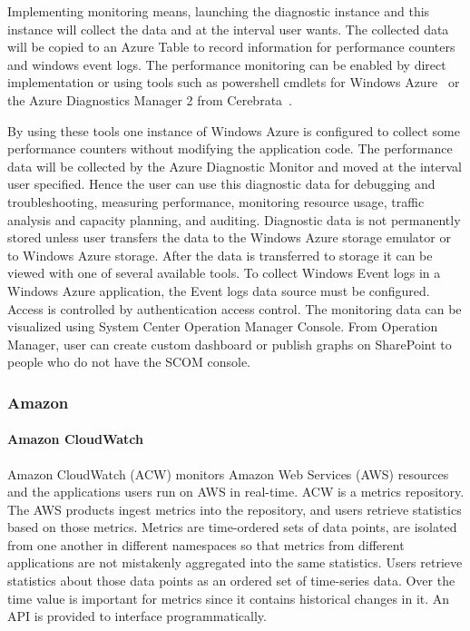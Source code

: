 \documentclass{sig-alternate-05-2015}
\begin{document}
Implementing monitoring means, launching the diagnostic instance and this instance will collect the data and at the interval user wants. The collected data will be copied to an Azure Table to record information for performance counters and windows event logs.  The performance monitoring can be enabled by direct implementation or using tools such as powershell cmdlets for Windows Azure~\cite{cmdlets} or the Azure Diagnostics Manager 2 from Cerebrata~\cite{cerebrata}.

By using these tools one instance of Windows Azure is configured to collect some performance counters without modifying the application code. The performance data will be collected by the Azure Diagnostic Monitor and moved at the interval user specified. Hence the user can use this diagnostic data for debugging and troubleshooting, measuring performance, monitoring resource usage, traffic analysis and capacity planning, and auditing. Diagnostic data is not permanently stored unless user transfers the data to the Windows Azure storage emulator or to Windows Azure storage. After the data is transferred to storage it can be viewed with one of several available tools. To collect Windows Event logs in a Windows Azure application, the Event logs data source must be configured. Access is controlled by authentication access control.  The monitoring data can be visualized using System Center Operation Manager Console. From Operation Manager, user can create custom dashboard or publish graphs on SharePoint to people who do not have the SCOM console.

\subsubsection{Amazon}

\paragraph{Amazon CloudWatch}

Amazon CloudWatch (ACW) \cite{cloudwatch2013monitoring} monitors Amazon Web Services (AWS) resources and the applications users run on AWS in real-time.  ACW is a metrics repository. The AWS products ingest metrics into the repository, and users retrieve statistics based on those metrics.  Metrics are time-ordered sets of data points, are isolated from one another in different namespaces so that metrics from different applications are not mistakenly aggregated into the same statistics. Users retrieve statistics about those data points as an ordered set of time-series data. Over the time value is important for metrics since it contains historical changes in it. An API is provided to interface programmatically.
\end{document}
